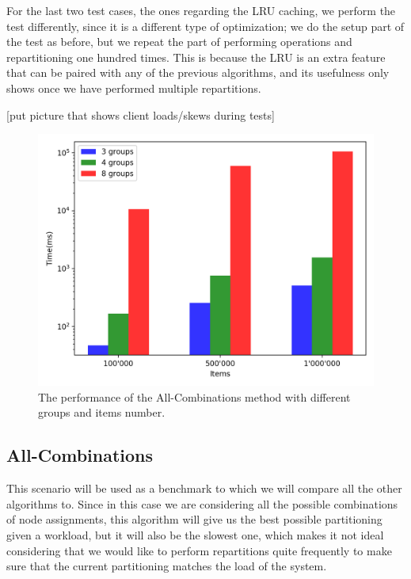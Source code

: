 For the last two test cases, the ones regarding the LRU caching, we perform the test differently, since it is a different type of optimization; we do the setup part of the test as before, but we repeat the part of performing operations and repartitioning one hundred times. This is because the LRU is an extra feature that can be paired with any of the previous algorithms, and its usefulness only shows once we have performed multiple repartitions.

[put picture that shows client loads/skews during tests]
\begin{figure}[!htb]
  \centering
  \includegraphics[width=\textwidth,height=\textheight,keepaspectratio]{img/all.png}
  \caption[caption]{The performance of the All-Combinations method with different groups and items number.}
  \label{fig:all}
\end{figure}

\subsection{All-Combinations}\label{sec:All-Combinations}
This scenario will be used as a benchmark to which we will compare all the other algorithms to. Since in this case we are considering all the possible combinations of node assignments, this algorithm will give us the best possible partitioning given a workload, but it will also be the slowest one, which makes it not ideal considering that we would like to perform repartitions quite frequently to make sure that the current partitioning matches the load of the system.

